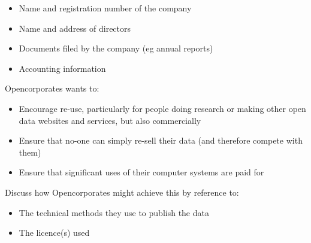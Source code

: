 \begin{itemize}
\item
  Name and registration number of the company
\item
  Name and address of directors
\item
  Documents filed by the company (eg annual reports)
\item
  Accounting information
\end{itemize}

Opencorporates wants to:

\begin{itemize}
\item
  Encourage re-use, particularly for people doing research or making
  other open data websites and services, but also commercially
\item
  Ensure that no-one can simply re-sell their data (and therefore
  compete with them)
\item
  Ensure that significant uses of their computer systems are paid for
\end{itemize}

Discuss how Opencorporates might achieve this by reference to:

\begin{itemize}
\item
  The technical methods they use to publish the data
\item
  The licence(s) used
\end{itemize}
